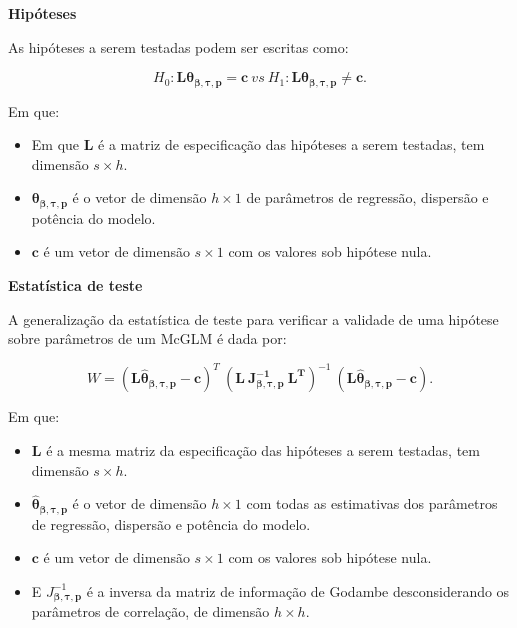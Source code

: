 \documentclass[10pt,
  aspectratio=169,
  serif,
  mathserif,
  professionalfont,
  compress,
  handout,
  ]{beamer}\usepackage[]{graphicx}\usepackage[]{color}
\begin{document}

\begin{frame}[c, allowframebreaks]

\textbf{Hipóteses}

As hipóteses a serem testadas podem ser escritas como:

$$H_0: \boldsymbol{L}\boldsymbol{\theta_{\beta,\tau,p}} = \boldsymbol{c} \ vs \ H_1: \boldsymbol{L}\boldsymbol{\theta_{\beta,\tau,p}} \neq \boldsymbol{c}.$$ 

Em que: 

\begin{itemize}
  
  \item Em que $\boldsymbol{L}$ é a matriz de especificação das hipóteses a serem testadas, tem dimensão $s \times h$. 
  
  \item $\boldsymbol{\theta_{\beta,\tau,p}}$ é o vetor de dimensão $h \times 1$ de parâmetros de regressão, dispersão e potência do modelo. 
  
  \item $\boldsymbol{c}$ é um vetor de dimensão $s \times 1$ com os valores sob hipótese nula.

\end{itemize}

\end{frame}


\begin{frame}[c, allowframebreaks]

\textbf{Estatística de teste}

A generalização da estatística de teste para verificar a validade de uma hipótese sobre parâmetros de um McGLM é dada por:

$$W = (\boldsymbol{L\hat\theta_{\beta,\tau,p}} - \boldsymbol{c})^T \ (\boldsymbol{L \ J_{\boldsymbol{{\beta,\tau,p}}}^{-1} \ L^T})^{-1} \ (\boldsymbol{L\hat\theta_{\beta,\tau,p}} - \boldsymbol{c}).$$

Em que: 

\begin{itemize}
  \item $\boldsymbol{L}$ é a mesma matriz da especificação das hipóteses a serem testadas, tem dimensão $s \times h$. 

  \item $\boldsymbol{\hat\theta_{\beta,\tau,p}}$ é o vetor de dimensão $h \times 1$ com todas as estimativas dos parâmetros de regressão, dispersão e potência do modelo. 

  \item $\boldsymbol{c}$ é um vetor de dimensão $s \times 1$ com os valores sob hipótese nula. 

  \item E $J_{\boldsymbol{{\beta,\tau,p}}}^{-1}$ é a inversa da matriz de informação de Godambe desconsiderando os parâmetros de correlação, de dimensão $h \times h$. 

\end{itemize}

\end{frame}
\end{document}
